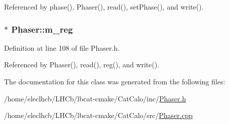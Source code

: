 Referenced by phase(), Phaser(), read(), setPhase(), and write().\hypertarget{classPhaser_ab6d751d77cb1e39723a6ac85d4cfec0c}{
\subsubsection[{m\_\-reg}]{$\ast$ {\bf Phaser::m\_\-reg}}}
\label{classPhaser_ab6d751d77cb1e39723a6ac85d4cfec0c}


Definition at line 108 of file Phaser.h.

Referenced by Phaser(), read(), reg(), and write().

The documentation for this class was generated from the following files:\begin{DoxyCompactItemize}
\item 
/home/eleclhcb/LHCb/lbcat-\/cmake/CatCalo/inc/\hyperlink{Phaser_8h}{Phaser.h}\item 
/home/eleclhcb/LHCb/lbcat-\/cmake/CatCalo/src/\hyperlink{Phaser_8cpp}{Phaser.cpp}\end{DoxyCompactItemize}
